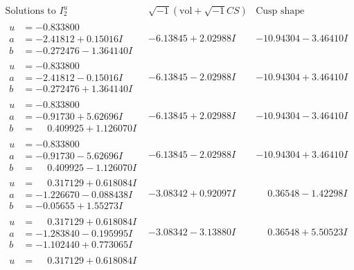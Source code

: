 \documentclass[1p]{elsarticle_modified}
\theoremstyle{definition}
\newcommand{\I}{\sqrt{-1}}
\begin{document}
$$\begin{array}{c|c|c}  
\text{Solutions to }I^u_{2}& \I (\text{vol} + \sqrt{-1}CS) & \text{Cusp shape}\\
 \hline 
\begin{aligned}
u &= -0.833800\phantom{ +0.000000I} \\
a &= -2.41812 + 0.15016 I \\
b &= -0.272476 - 1.364140 I\end{aligned}
 & -6.13845 + 2.02988 I & -10.94304 - 3.46410 I \\ \hline\begin{aligned}
u &= -0.833800\phantom{ +0.000000I} \\
a &= -2.41812 - 0.15016 I \\
b &= -0.272476 + 1.364140 I\end{aligned}
 & -6.13845 - 2.02988 I & -10.94304 + 3.46410 I \\ \hline\begin{aligned}
u &= -0.833800\phantom{ +0.000000I} \\
a &= -0.91730 + 5.62696 I \\
b &= \phantom{-}0.409925 + 1.126070 I\end{aligned}
 & -6.13845 + 2.02988 I & -10.94304 - 3.46410 I \\ \hline\begin{aligned}
u &= -0.833800\phantom{ +0.000000I} \\
a &= -0.91730 - 5.62696 I \\
b &= \phantom{-}0.409925 - 1.126070 I\end{aligned}
 & -6.13845 - 2.02988 I & -10.94304 + 3.46410 I \\ \hline\begin{aligned}
u &= \phantom{-}0.317129 + 0.618084 I \\
a &= -1.226670 - 0.088438 I \\
b &= -0.05655 + 1.55273 I\end{aligned}
 & -3.08342 + 0.92097 I & \phantom{-}0.36548 - 1.42298 I \\ \hline\begin{aligned}
u &= \phantom{-}0.317129 + 0.618084 I \\
a &= -1.283840 - 0.195995 I \\
b &= -1.102440 + 0.773065 I\end{aligned}
 & -3.08342 - 3.13880 I & \phantom{-}0.36548 + 5.50523 I \\ \hline\begin{aligned}
u &= \phantom{-}0.317129 + 0.618084 I \\

\end{aligned}
\end{array}$$
\end{document}
